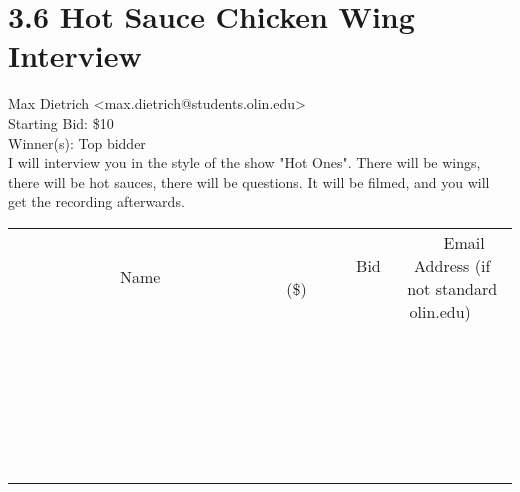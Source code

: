 \documentclass[11pt]{article}
\begin{document}
					\section*{3.6 Hot Sauce Chicken Wing Interview}
					Max Dietrich <max.dietrich@students.olin.edu> \\
					Starting Bid: \$10 \\
					Winner(s): Top bidder \\
					I will interview you in the style of the show  "Hot Ones".  There will be wings, there will be hot sauces, there will be questions.  It will be filmed, and you will get the recording afterwards. \\
					[6ex]
					\begin{tabular}{c c c}
						~~~~~~~~~~~~~Name~~~~~~~~~~~~~ & ~~~~~~~~~Bid (\$)~~~~~~~~~ & ~~~Email Address (if not standard olin.edu)~~~ \\
				
 & & \\
\hline
 & & \\
\hline
 & & \\
\hline
 & & \\
\hline
 & & \\
\hline
 & & \\
\hline
 & & \\
\hline
 & & \\
\hline
 & & \\
\hline
 & & \\
\hline
 & & \\
\hline
 & & \\
\hline
 & & \\
\hline
 & & \\
\hline
 & & \\
\hline
 & & \\
\hline
 & & \\
\hline
 & & \\
\hline
 & & \\
\hline
 & & \\
\hline
 & & \\
\hline
 & & \\
\hline
 & & \\
\hline
 & & \\
\hline
 & & \\
\hline
 & & \\
\hline
					\end{tabular}
					\clearpage
				
\end{document}
